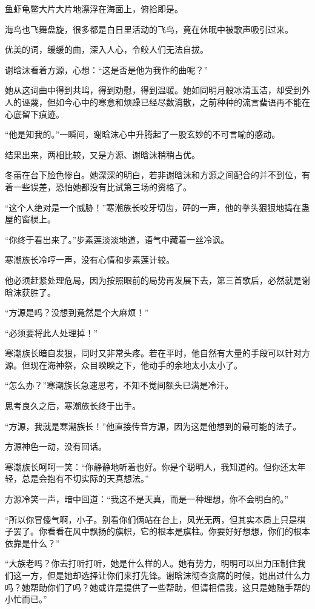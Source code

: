 \begin{this_body}
鱼虾龟鳖大片大片地漂浮在海面上，俯拾即是。

海鸟也飞舞盘旋，很多都是白日里活动的飞鸟，竟在休眠中被歌声吸引过来。

优美的词，缓缓的曲，深入人心，令鲛人们无法自拔。

谢晗沫看着方源，心想：“这是否是他为我作的曲呢？”

她从这词曲中得到共鸣，得到劝慰，得到温暖。她如同明月般冰清玉洁，却受到外人的诬蔑，但如今心中的寒意和烦躁已经尽数消散，之前种种的流言蜚语再不能在心底留下痕迹。

“他是知我的。”一瞬间，谢晗沫心中升腾起了一股玄妙的不可言喻的感动。

结果出来，两相比较，又是方源、谢晗沫稍稍占优。

冬蕾在台下脸色惨白。她深深的明白，若非谢晗沫和方源之间配合的并不到位，有着一些误差，恐怕她都没有比试第三场的资格了。

“这个人绝对是一个威胁！”寒潮族长咬牙切齿，砰的一声，他的拳头狠狠地捣在蛊屋的窗棂上。

“你终于看出来了。”步素莲淡淡地道，语气中藏着一丝冷讽。

寒潮族长冷哼一声，没有心情和步素莲计较。

他必须赶紧处理危局，因为按照眼前的局势再发展下去，第三首歌后，必然就是谢晗沫获胜了。

“方源是吗？没想到竟然是个大麻烦！”

“必须要将此人处理掉！”

寒潮族长暗自发狠，同时又非常头疼。若在平时，他自然有大量的手段可以针对方源。但现在海神祭，众目睽睽之下，他动手的余地太小太小了。

“怎么办？”寒潮族长急速思考，不知不觉间额头已满是冷汗。

思考良久之后，寒潮族长终于出手。

“方源，我就是寒潮族长！”他直接传音方源，因为这是他想到的最可能的法子。

方源神色一动，没有回话。

寒潮族长呵呵一笑：“你静静地听着也好。你是个聪明人，我知道的。但你还太年轻，总是会抱有不切实际的天真想法。”

方源冷笑一声，暗中回道：“我这不是天真，而是一种理想，你不会明白的。”

“所以你冒傻气啊，小子。别看你们俩站在台上，风光无两，但其实本质上只是棋子罢了。你看看在风中飘扬的旗帜，它的根本是旗柱。你要好好想想，你们的根本依靠是什么？”

“大族老吗？你去打听打听，她是什么样的人。她有势力，明明可以出力压制住我们这一方，但是她却选择让你们来打先锋。谢晗沫彻查贪腐的时候，她出过什么力吗？她帮助你们了吗？她或许是提供了一些帮助，但请相信我，这只是她随手帮的小忙而已。”


\end{this_body}
